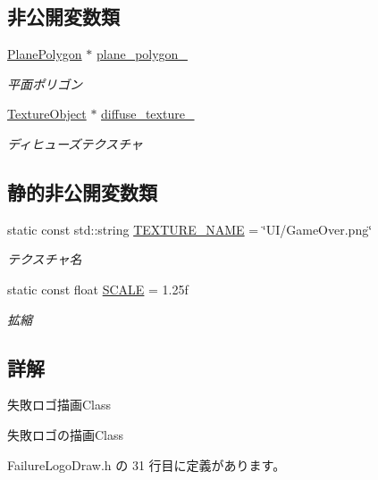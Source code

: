 \subsection*{非公開変数類}
\begin{DoxyCompactItemize}
\item 
\mbox{\hyperlink{class_plane_polygon}{Plane\+Polygon}} $\ast$ \mbox{\hyperlink{class_failure_logo_draw_a5de75c49fbbbb9e1a9a8445666aa2bf3}{plane\+\_\+polygon\+\_\+}}
\begin{DoxyCompactList}\small\item\em 平面ポリゴン \end{DoxyCompactList}\item 
\mbox{\hyperlink{class_texture_object}{Texture\+Object}} $\ast$ \mbox{\hyperlink{class_failure_logo_draw_a525a0b117af4655588bbd1432da50d13}{diffuse\+\_\+texture\+\_\+}}
\begin{DoxyCompactList}\small\item\em ディヒューズテクスチャ \end{DoxyCompactList}\end{DoxyCompactItemize}
\subsection*{静的非公開変数類}
\begin{DoxyCompactItemize}
\item 
static const std\+::string \mbox{\hyperlink{class_failure_logo_draw_a287b81d9dcab4be17a88d9aff7c97a9a}{T\+E\+X\+T\+U\+R\+E\+\_\+\+N\+A\+ME}} = \char`\"{}UI/Game\+Over.\+png\char`\"{}
\begin{DoxyCompactList}\small\item\em テクスチャ名 \end{DoxyCompactList}\item 
static const float \mbox{\hyperlink{class_failure_logo_draw_a356d2f6f14682ad6f2e9a01ffdd587b0}{S\+C\+A\+LE}} = 1.\+25f
\begin{DoxyCompactList}\small\item\em 拡縮 \end{DoxyCompactList}\end{DoxyCompactItemize}


\subsection{詳解}
失敗ロゴ描画\+Class 

失敗ロゴの描画\+Class 

 Failure\+Logo\+Draw.\+h の 31 行目に定義があります。



